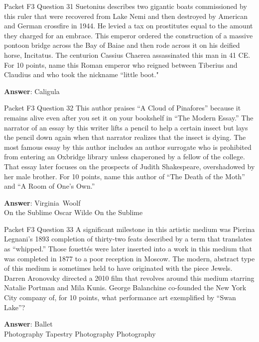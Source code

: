 \begin{frame}{Packet F3 Question 31}
Suetonius describes two gigantic boats commissioned by this ruler that were recovered from Lake Nemi and then destroyed by American and German crossfire in 1944. He levied a tax on prostitutes equal to the amount they charged for an embrace. This emperor ordered the construction of a massive pontoon bridge   across the Bay of Baiae and then rode     across it on his deified horse, Incitatus. The centurion Cassius Chaerea assassinated this man in   41 CE. For 10 points, name this Roman emperor who reigned between Tiberius and Claudius and who took the nickname “little boot."

\textbf{Answer}: Caligula\\
\end{frame}

\begin{frame}{Packet F3 Question 32}
This author praises ``A   Cloud of Pinafores'' because it remains alive even after you set it on your bookshelf in ``The Modern Essay.'' The narrator   of an essay by this   writer lifts a pencil to help a certain   insect but lays the pencil down again when that narrator realizes that the insect is dying. The most famous essay by this author includes an author surrogate who is prohibited from entering an Oxbridge library unless chaperoned by a fellow of the college. That essay later focuses on the prospects of Judith Shakespeare, overshadowed by her   male brother. For 10 points, name this author of ``The Death of the Moth'' and ``A Room of One's Own.''  

\textbf{Answer}: Virginia\ Woolf\\
 On the Sublime
 Oscar Wilde
 On the Sublime
\end{frame}

\begin{frame}{Packet F3 Question 33}
A significant milestone in this artistic medium was Pierina Legnani's 1893 completion of thirty-two feats described by a term that translates as ``whipped.'' Those fouettés were later inserted into a work in this medium that was completed in 1877 to a poor reception in Moscow. The modern, abstract type of this medium is sometimes   held to have originated with the piece Jewels. Darren Aronovsky directed a 2010 film that revolves around this medium starring Natalie Portman and Mila Kunis. George Balanchine co-founded the New York City company of, for 10 points, what performance art exemplified by ``Swan Lake''?        

\textbf{Answer}: Ballet\\
 Photography
 Tapestry
 Photography
 Photography
\end{frame}

